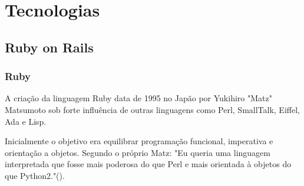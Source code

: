 \chapter{Tecnologias}
\label{cap:tecnologias}
\section{Ruby on Rails}
\subsection{Ruby}
    \par A criação da linguagem Ruby data de 1995 no Japão por Yukihiro "Matz" Matsumoto sob forte influência de outras linguagens como Perl, SmallTalk, Eiffel, Ada e Lisp.
    \par Inicialmente o objetivo era equilibrar programação funcional, imperativa e orientação a objetos. Segundo o próprio Matz: "Eu queria uma linguagem interpretada que fosse mais poderosa do que Perl e mais orientada à objetos do que Python2."(\cite{rubydocs}).
